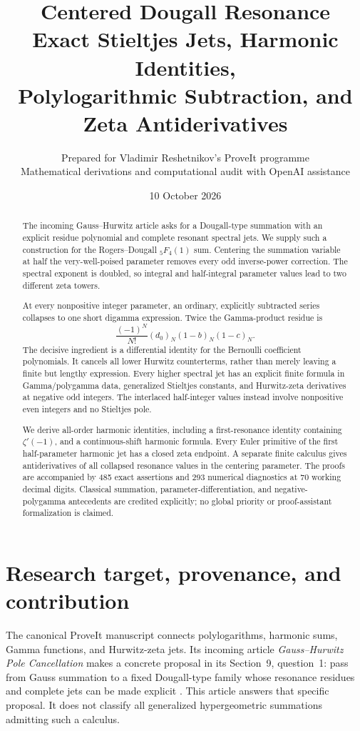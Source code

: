 \documentclass[11pt,letterpaper]{article}
\title{\textbf{Centered Dougall Resonance}\\[7pt]
\large Exact Stieltjes Jets, Harmonic Identities,\\
Polylogarithmic Subtraction, and Zeta Antiderivatives}
\author{Prepared for Vladimir Reshetnikov's ProveIt programme\\
\small Mathematical derivations and computational audit with OpenAI assistance}
\date{10 October 2026}
\numberwithin{equation}{section}
\theoremstyle{definition}
\theoremstyle{remark}
\begin{document}
\maketitle
\thispagestyle{plain}
\begin{abstract}
The incoming Gauss--Hurwitz article asks for a Dougall-type summation with an
explicit residue polynomial and complete resonant spectral jets. We supply
such a construction for the Rogers--Dougall ${}_5F_4(1)$ sum. Centering the
summation variable at half the very-well-poised parameter removes every odd
inverse-power correction. The spectral exponent is doubled, so integral
and half-integral parameter values lead to two different zeta towers.

At every nonpositive integer parameter, an ordinary, explicitly subtracted
series collapses to one short digamma expression. Twice the Gamma-product
residue is
\[
 \frac{(-1)^N}{N!}(d_0)_N(1-b)_N(1-c)_N.
\]
The decisive ingredient is a differential identity for the Bernoulli
coefficient polynomials. It cancels all lower Hurwitz counterterms, rather
than merely leaving a finite but lengthy expression. Every higher spectral
jet has an explicit finite formula in Gamma/polygamma data, generalized
Stieltjes constants, and Hurwitz-zeta derivatives at negative odd integers.
The interlaced half-integer values instead involve nonpositive even
integers and no Stieltjes pole.

We derive all-order harmonic identities, including a first-resonance
identity containing $\zeta'(-1)$, and a continuous-shift harmonic formula.
Every Euler primitive of the first half-parameter harmonic jet has a closed
zeta endpoint. A separate finite calculus gives antiderivatives of all
collapsed resonance values in the centering parameter. The proofs are
accompanied by 485 exact assertions and 293 numerical diagnostics at 70
working decimal digits. Classical summation, parameter-differentiation,
and negative-polygamma antecedents are credited explicitly; no global
priority or proof-assistant formalization is claimed.
\end{abstract}
\clearpage
\begingroup
\small
\setlength{\parskip}{0pt}
\tableofcontents
\endgroup
\clearpage

\section{Research target, provenance, and contribution}
\label{dr:sec:scope}

The canonical ProveIt manuscript connects polylogarithms, harmonic sums,
Gamma functions, and Hurwitz-zeta jets. Its incoming article
\emph{Gauss--Hurwitz Pole Cancellation} makes a concrete proposal in its
Section~9, question~1: pass from Gauss summation to a fixed Dougall-type
family whose resonance residues and complete jets can be made explicit
\cite{incoming}. This article answers that specific proposal. It does not
classify all generalized hypergeometric summations admitting such a
calculus.
\end{document}
